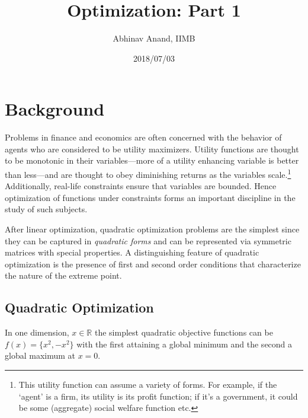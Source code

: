 \documentclass[11pt,]{article}
\title{Optimization: Part 1}
\author{Abhinav Anand, IIMB}
\date{2018/07/03}
\let\rmarkdownfootnote\footnote%
\def\footnote{\protect\rmarkdownfootnote}
\begin{document}
\maketitle

\section{Background}\label{background}

Problems in finance and economics are often concerned with the behavior
of agents who are considered to be utility maximizers. Utility functions
are thought to be monotonic in their variables---more of a utility
enhancing variable is better than less---and are thought to obey
diminishing returns as the variables scale.\footnote{This utility
  function can assume a variety of forms. For example, if the `agent' is
  a firm, its utility is its profit function; if it's a government, it
  could be some (aggregate) social welfare function etc.} Additionally,
real-life constraints ensure that variables are bounded. Hence
optimization of functions under constraints forms an important
discipline in the study of such subjects.

After linear optimization, quadratic optimization problems are the
simplest since they can be captured in \emph{quadratic forms} and can be
represented via symmetric matrices with special properties. A
distinguishing feature of quadratic optimization is the presence of
first and second order conditions that characterize the nature of the
extreme point.

\subsection{Quadratic Optimization}\label{quadratic-optimization}

In one dimension, \(x\in \mathbb{R}\) the simplest quadratic objective
functions can be \(f(x)=\{x^2, -x^2\}\) with the first attaining a
global minimum and the second a global maximum at \(x=0\).
\end{document}
